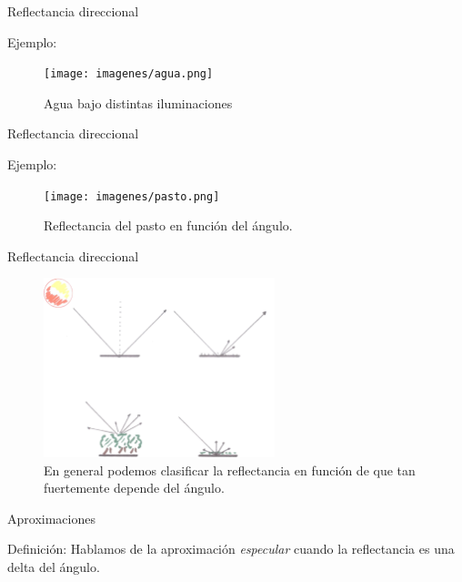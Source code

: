 \documentclass[]{beamer}
\begin{document}
\begin{frame}{Reflectancia direccional}
  \begin{exampleblock}{Ejemplo:}
    \begin{figure}
      \texttt{[image: imagenes/agua.png]}
      \caption{Agua bajo distintas iluminaciones}
    \end{figure}
  \end{exampleblock}
\end{frame}

\begin{frame}{Reflectancia direccional}
  \begin{exampleblock}{Ejemplo:}
    \begin{figure}
      \texttt{[image: imagenes/pasto.png]}
      \caption{Reflectancia del pasto en función del ángulo.}
    \end{figure}
  \end{exampleblock}
\end{frame}

\begin{frame}{Reflectancia direccional}
  \begin{figure}
    \includegraphics[width=0.6\textwidth]{imagenes/reflectancias.png}
    \caption{En general podemos clasificar la reflectancia en función de que tan fuertemente depende del ángulo.}
  \end{figure}
\end{frame}

\begin{frame}{Aproximaciones}
  \begin{block}{Definición:}
    Hablamos de la aproximación \emph{especular} cuando la reflectancia es una delta del ángulo.
  \end{block}
\end{frame}
\end{document}
